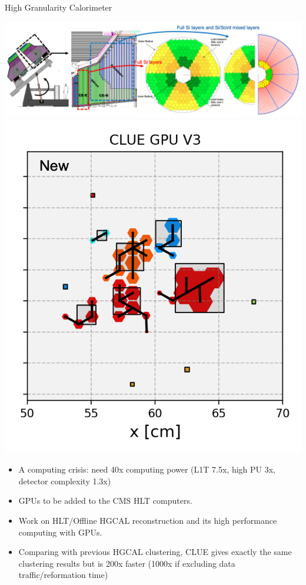 \begin{frame}{High Granularity Calorimeter}
\smaller
    \begin{center}
        \includegraphics[height=0.32\textheight]{chapters/HGCal/figures/chep/hgcal2.png}
        \includegraphics[height=0.3\textheight]{slides/figures/clue.png}
    \end{center}
    
    \begin{itemize} 
    \smaller
        \item A computing crisis: need 40x computing power (L1T 7.5x, high PU 3x, detector complexity 1.3x) 
        \item GPUs to be added to the CMS HLT computers.
        \item Work on HLT/Offline HGCAL reconstruction and its high performance computing with GPUs.
        \item Comparing with previous HGCAL clustering, CLUE gives exactly the same clustering results but is 200x faster (1000x if excluding data traffic/reformation time) 
    \end{itemize}
    

\end{frame}
